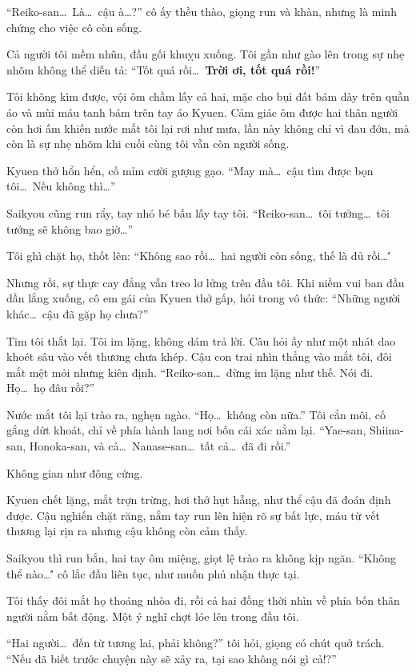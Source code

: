 \documentclass[../main.tex]{subfiles}
\begin{document}
``Reiko-san\dots\ Là\dots\ cậu à\dots?'' cô ấy thều thào, giọng run và khàn, nhưng là minh chứng cho việc cô còn sống.

Cả người tôi mềm nhũn, đầu gối khuỵu xuống. Tôi gần như gào lên trong sự nhẹ nhõm không thể diễn tả: ``Tốt quá rồi\dots\ \textbf{Trời ơi, tốt quá rồi!}''

Tôi không kìm được, vội ôm chầm lấy cả hai, mặc cho bụi đất bám dày trên quần áo và mùi máu tanh bám trên tay áo Kyuen. Cảm giác ôm được hai thân người còn hơi ấm khiến nước mắt tôi lại rơi như mưa, lần này không chỉ vì đau đớn, mà còn là sự nhẹ nhõm khi cuối cùng tôi vẫn còn người sống.

Kyuen thở hổn hển, cố mỉm cười gượng gạo. ``May mà\dots\ cậu tìm được bọn tôi\dots\ Nếu không thì\dots''

Saikyou cũng run rẩy, tay nhỏ bé bấu lấy tay tôi. ``Reiko-san\dots\ tôi tưởng\dots\ tôi tưởng sẽ không bao giờ\dots''

Tôi ghì chặt họ, thốt lên: ``Không sao rồi\dots\ hai người còn sống, thế là đủ rồi\dots\''

Nhưng rồi, sự thực cay đắng vẫn treo lơ lửng trên đầu tôi. Khi niềm vui ban đầu dần lắng xuống, cô em gái của Kyuen thở gấp, hỏi trong vô thức: ``Những người khác\dots\ cậu đã gặp họ chưa?''

Tim tôi thắt lại. Tôi im lặng, không dám trả lời. Câu hỏi ấy như một nhát dao khoét sâu vào vết thương chưa khép. Cậu con trai nhìn thẳng vào mắt tôi, đôi mắt mệt mỏi nhưng kiên định. ``Reiko-san\dots\ đừng im lặng như thế. Nói đi. Họ\dots\ họ đâu rồi?''

Nước mắt tôi lại trào ra, nghẹn ngào. ``Họ\dots\ không còn nữa.'' Tôi cắn môi, cố gắng dứt khoát, chỉ về phía hành lang nơi bốn cái xác nằm lại. ``Yae-san, Shiina-san, Honoka-san, và cả\dots\ Nanase-san\dots\ tất cả\dots\ đã đi rồi.''

Không gian như đông cứng.

Kyuen chết lặng, mắt trợn trừng, hơi thở hụt hẫng, như thể cậu đã đoán định được. Cậu nghiến chặt răng, nắm tay run lên hiện rõ sự bất lực, máu từ vết thương lại rịn ra nhưng cậu không còn cảm thấy.

Saikyou thì run bắn, hai tay ôm miệng, giọt lệ trào ra không kịp ngăn. ``Không thể nào\dots\'' cô lắc đầu liên tục, như muốn phủ nhận thực tại.

Tôi thấy đôi mắt họ thoáng nhòa đi, rồi cả hai đồng thời nhìn về phía bốn thân người nằm bất động. Một ý nghĩ chợt lóe lên trong đầu tôi.

``Hai người\dots\ đến từ tương lai, phải không?'' tôi hỏi, giọng có chút quở trách. ``Nếu đã biết trước chuyện này sẽ xảy ra, tại sao không nói gì cả!?''
\end{document}
